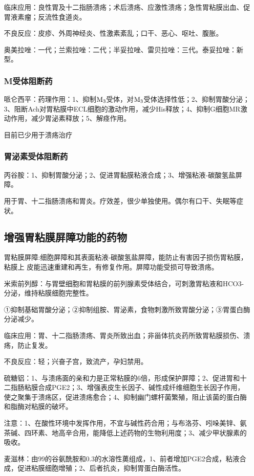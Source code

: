 \documentclass[UTF8]{ctexbook}
\begin{document}
临床应用：良性胃及十二指肠溃疡；术后溃疡、应激性溃疡；急性胃粘膜出血、促胃液素瘤；反流性食道炎。

不良反应：皮疹、外周神经炎、性激素紊乱；口干、恶心、呕吐、腹胀。

奥美拉唑：一代；兰索拉唑：二代；半妥拉唑、雷贝拉唑：三代。泰妥拉唑：新型。
\subsubsection{M受体阻断药}
哌仑西平：药理作用：1、抑制\(\textup{M}_{3}\)受体，对\(\textup{M}_{3}\)受体选择性低；2、抑制胃酸分泌；3、阻断Ach对胃粘膜中ECL细胞的激动作用，减少His释放；4、抑制G细胞MR激动作用，减少胃泌素释放；5、解痉作用。

目前已少用于溃疡治疗
\subsubsection{胃泌素受体阻断药}
丙谷胺：1、抑制胃酸分泌；2、促进胃黏膜粘液合成；3、增强粘液-碳酸氢盐屏障。

用于胃、十二指肠溃疡和胃炎。疗效差，很少单独使用。偶尔有口干、失眠等症状。
\subsection{增强胃粘膜屏障功能的药物}
胃粘膜屏障:细胞屏障和其表面粘液-碳酸氢盐屏障，能防止有害因子损伤胃粘膜，粘膜上  皮能迅速重建和再生，有修复作用。屏障功能受损可导致溃疡。

米索前列醇：与胃壁细胞和胃粘膜的前列腺素受体结合，可刺激胃粘液和HCO3-分泌，维持粘膜细胞完整性。

①抑制基础胃酸分泌；②抑制组胺、胃泌素，食物刺激所致胃酸分泌；③胃蛋白酶分泌减少。

临床应用：胃、十二指肠溃疡、胃炎所致出血；非甾体抗炎药所致胃粘膜损伤、溃疡，防止复发。

不良反应：轻；兴奋子宫，致流产，孕妇禁用。 

硫糖铝：1、与溃疡面的亲和力是正常粘膜的6倍，形成保护屏障；2、促进胃和十二指肠粘膜合成PGE2；3、增强表皮生长因子、碱性成纤维细胞生长因子作用，使之聚集于溃疡区，促进溃疡愈合；4、抑制幽门螺杆菌繁殖，阻止该菌的蛋白酶和脂酶对粘膜的破坏。

注意：1、在酸性环境中发挥作用，不宜与碱性药合用；与布洛芬、吲哚美锌、氨茶碱、四环素、地高辛合用，能降低上述药物的生物利用度；3、减少甲状腺素的吸收。

麦滋林：由99的谷氨酰胺和0.3的水溶性薁组成，1、前者增加PGE2合成，粘液合成，促进粘膜细胞增殖；2、后者抗炎，抑制胃蛋白酶活性。
\end{document}
